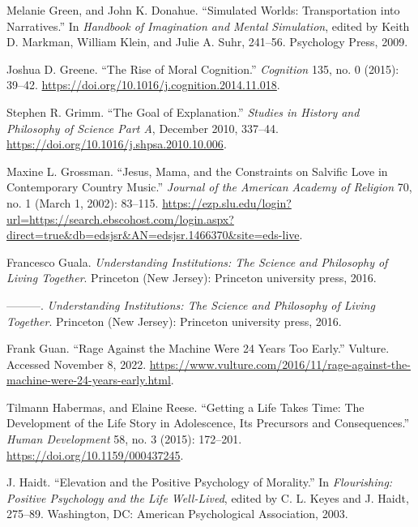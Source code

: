 \documentclass[phdthesis,12pt,final,a4paper]{wuthesis}
\newlength{\cslhangindent}
\newenvironment{CSLReferences}[2] %
{\begin{list}{}{%
	\setlength{\itemindent}{0pt}
	\setlength{\leftmargin}{0pt}
	\setlength{\parsep}{0pt}
	\ifodd #1
	\setlength{\leftmargin}{\cslhangindent}
	\setlength{\itemindent}{-1\cslhangindent}
	\fi
	\setlength{\itemsep}{#2\baselineskip}}}
{\end{list}}
\theoremstyle{definition}
\theoremstyle{definition}
\theoremstyle{definition}
\theoremstyle{definition}
\theoremstyle{remark}
\begin{document}
\begin{CSLReferences}{1}{0}
Melanie Green, and John K. Donahue. {``Simulated {Worlds}: {Transportation} into {Narratives}.''} In \emph{Handbook of {Imagination} and {Mental Simulation}}, edited by Keith D. Markman, William Klein, and Julie A. Suhr, 241--56. Psychology Press, 2009.

Joshua D. Greene. {``The Rise of Moral Cognition.''} \emph{Cognition} 135, no. 0 (2015): 39--42. \url{https://doi.org/10.1016/j.cognition.2014.11.018}.

Stephen R. Grimm. {``The Goal of Explanation.''} \emph{Studies in History and Philosophy of Science Part A}, December 2010, 337--44. \url{https://doi.org/10.1016/j.shpsa.2010.10.006}.

Maxine L. Grossman. {``Jesus, {Mama}, and the {Constraints} on {Salvific Love} in {Contemporary Country Music}.''} \emph{Journal of the American Academy of Religion} 70, no. 1 (March 1, 2002): 83--115. \url{https://ezp.slu.edu/login?url=https://search.ebscohost.com/login.aspx?direct=true&db=edsjsr&AN=edsjsr.1466370&site=eds-live}.

Francesco Guala. \emph{Understanding Institutions: The Science and Philosophy of Living Together}. Princeton (New Jersey): Princeton university press, 2016.

---------. \emph{Understanding {Institutions}: {The Science} and {Philosophy} of {Living Together}}. Princeton (New Jersey): Princeton university press, 2016.

Frank Guan. {``Rage Against the Machine Were 24 Years Too Early.''} Vulture. Accessed November 8, 2022. \url{https://www.vulture.com/2016/11/rage-against-the-machine-were-24-years-early.html}.

Tilmann Habermas, and Elaine Reese. {``Getting a Life Takes Time: The Development of the Life Story in Adolescence, Its Precursors and Consequences.''} \emph{Human Development} 58, no. 3 (2015): 172--201. \url{https://doi.org/10.1159/000437245}.

J. Haidt. {``Elevation and the Positive Psychology of Morality.''} In \emph{Flourishing: {Positive} Psychology and the Life Well-Lived}, edited by C. L. Keyes and J. Haidt, 275--89. Washington, DC: American Psychological Association, 2003.


\end{CSLReferences}
\end{document}
